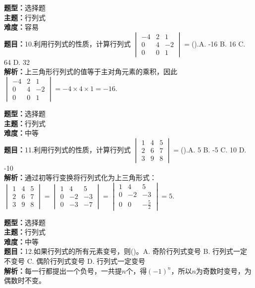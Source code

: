 \documentclass{ctexart}
\newenvironment{question}[5]{%
	\noindent\textbf{题型：}#1\\
	\textbf{主题：}#2\\
	\textbf{难度：}#3\\
	\textbf{题目：}#4\\
	\textbf{解析：}#5\\
	\vspace{1em}
}{}
\begin{document}
	\begin{question}
		{选择题}
		{行列式}
		{容易}
		{10.利用行列式的性质，计算行列式 $\begin{vmatrix}-4 & 2 & 1 \\ 0 & 4 & -2 \\ 0 & 0 & 1\end{vmatrix}=$().A. -16 B. 16 C. 64 D. 32}
		{上三角形行列式的值等于主对角元素的乘积，因此 $\begin{vmatrix}-4 & 2 & 1 \\ 0 & 4 & -2 \\ 0 & 0 & 1\end{vmatrix}=-4 \times 4 \times 1=-16$.}
	\end{question}
	
	\begin{question}
		{选择题}
		{行列式}
		{中等}
		{11.利用行列式的性质，计算行列式 $\begin{vmatrix}1 & 4 & 5 \\ 2 & 6 & 7 \\ 3 & 9 & 8\end{vmatrix}=$().A. 5 B. -5 C. 10 D. -10}
		{通过初等行变换将行列式化为上三角形式：$\begin{vmatrix}1 & 4 & 5 \\ 2 & 6 & 7 \\ 3 & 9 & 8\end{vmatrix}=\begin{vmatrix}1 & 4 & 5 \\ 0 & -2 & -3 \\ 0 & -3 & -7\end{vmatrix}=\begin{vmatrix}1 & 4 & 5 \\ 0 & -2 & -3 \\ 0 & 0 & -\frac{5}{2}\end{vmatrix}=5$.}
	\end{question}
	
	\begin{question}
		{选择题}
		{行列式}
		{中等}
		{12.如果行列式的所有元素变号，则()。A. 奇阶行列式变号 B. 行列式一定不变号 C. 偶阶行列式变号 D. 行列式一定变号}
		{每一行都提出一个负号，一共提$n$个，得$(-1)^n$，所以$n$为奇数时变号，为偶数时不变。}
	\end{question}
	
\end{document}
